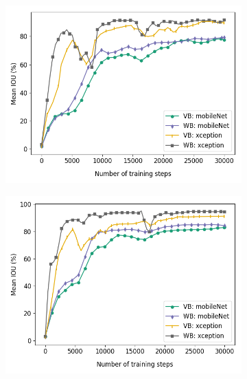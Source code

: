 	\begin{figure}[!htb]
		\begin{subfigure}[c]{.5\textwidth}
			\centering
			\includegraphics[width=1\linewidth]{images/mobxcep_full}
		\end{subfigure}
		\begin{subfigure}[c]{.5\textwidth}
			\centering
			\includegraphics[width=1\linewidth]{images/mobxcep_size}
		\end{subfigure}
		\begin{subfigure}[c]{.5\textwidth}
			\centering

\end{subfigure}
\end{figure}
